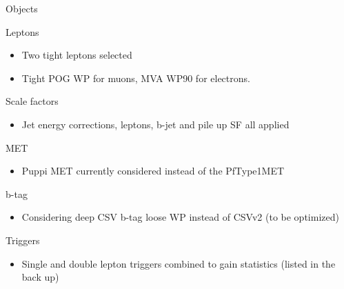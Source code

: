 \documentclass[9pt]{beamer}
\begin{document}
\begin{frame}{Objects}
\justifying
\vspace{5pt} \begin{block}{\centering Leptons}\end{block} \vspace{-6pt}
\begin{itemize}
\justifying
\item Two tight leptons selected
\item \alert{Tight POG WP} for muons, \alert{MVA WP90} for electrons.
\end{itemize} \vfill

\begin{block}{\centering Scale factors}\end{block} \vspace{-6pt}
\begin{itemize}
\justifying
\item Jet energy corrections, leptons, b-jet and pile up SF all applied
\end{itemize} \vfill

\begin{block}{\centering MET}\end{block} \vspace{-6pt}
\begin{itemize}
\justifying
\item \alert{Puppi MET} currently considered instead of the PfType1MET %

\end{itemize} \vfill

\begin{block}{\centering b-tag}\end{block} \vspace{-6pt}
\begin{itemize}
\justifying
\item Considering deep CSV b-tag loose WP instead of CSVv2 (to be optimized)
\end{itemize} \vfill

\begin{block}{\centering Triggers}\end{block} \vspace{-6pt}
\begin{itemize}
\justifying
\item Single and double lepton triggers combined to gain statistics (listed in the \alert{back up})
\end{itemize} \vfill
\end{frame}
\end{document}
